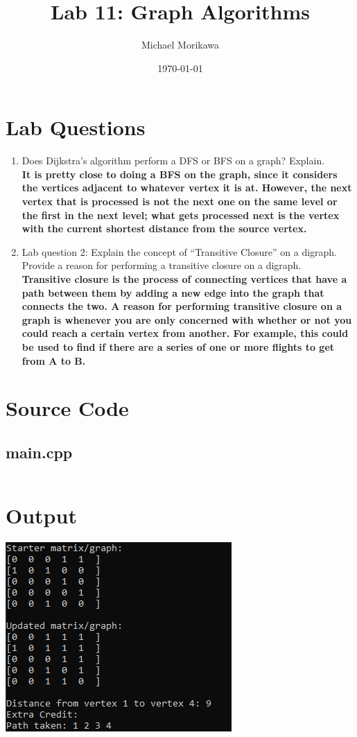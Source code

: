 \documentclass{article}
\title{Lab 11: Graph Algorithms}
\author{Michael Morikawa}
\date{\today}
\begin{document}
\maketitle
\section{Lab Questions}
\begin{enumerate}[label=\textbf{Question \arabic*}]
      \item  Does Dijkstra's algorithm perform a DFS or BFS on a graph? Explain. \\
            \textbf{
                  It is pretty close to doing a BFS on the graph, since it considers
                  the vertices adjacent to whatever vertex it is at. However, the next vertex
                  that is processed is not the next one on the same level or the first in the next level;
                  what gets processed next is the vertex with the current shortest distance from the source
                  vertex.
            }
      \item Lab question 2: Explain the concept of “Transitive Closure” on a digraph. Provide a
            reason for performing a transitive closure on a digraph. \\
            \textbf{
                  Transitive closure is the process of connecting vertices that have a path between them by
                  adding a new edge into the graph that connects the two. A reason for performing transitive
                  closure on a graph is whenever you are only concerned with whether or not you could reach
                  a certain vertex from another. For example, this could be used to find if there are a series
                  of one or more flights to get from A to B.
            }


\end{enumerate}

\section{Source Code}

\subsection{main.cpp}
\inputminted{c++}{../src/main.cpp}

\section{Output}
\includegraphics[]{output.png}
\end{document}
